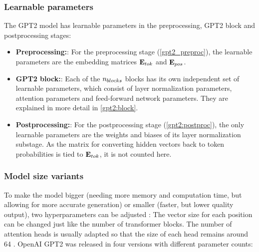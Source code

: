 
\subsubsection{Learnable parameters}

The GPT2 model has learnable parameters in the preprocessing, GPT2 block and postprocessing stages:

\begin{itemize}
		\item \textbf{Preprocessing:}: For the preprocessing stage (\cref{gpt2_preproc}), the learnable parameters are the embedding matrices ${\mathbf{E}_{tok}}$ and ${\mathbf{E}_{pos}}$.
		\item \textbf{GPT2 block:}: Each of the ${n_{blocks}}$ blocks has its own independent set of learnable parameters, which consist of layer normalization parameters, attention parameters and feed-forward network parameters. They are explained in more detail in \cref{gpt2:block}.
		\item \textbf{Postprocessing:}: For the postprocessing stage (\cref{gpt2:postproc}), the only learnable parameters are the weights and biases of its layer normalization substage. As the matrix for converting hidden vectors back to token probabilities is tied to ${\mathbf{E}_{tok}}$, it is not counted here.
\end{itemize}

\subsubsection{Model size variants}

\label{gpt2:parameters}

To make the model bigger (needing more memory and computation time, but allowing for more accurate generation) or smaller (faster, but lower quality output), two hyperparameters can be adjusted  : The vector size for each position can be changed just like the number of transformer blocks. The number of attention heads is usually adapted so that the size of each head remains around 64  \cite{hfpretrained}.
OpenAI GPT2 was released in four versions with different parameter counts:


